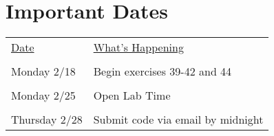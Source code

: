 \documentclass[10pt]{article}
\begin{document}
\section*{Important Dates}


\begin{center}
\begin{tabular}{ll}
  \underline{Date} & \underline{What's Happening} \\ \\
   Monday 2/18 & Begin exercises 39-42 and 44 \\ \\
   Monday 2/25 & Open Lab Time  \\ \\
   Thursday 2/28 & Submit code via email by midnight
\end{tabular}
\end{center}
\end{document}
